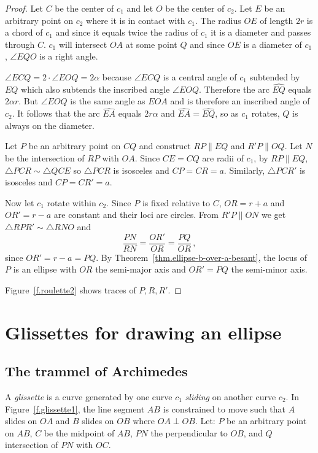 \begin{proof}
Let $C$ be the center of $c_1$ and let $O$ be the center of $c_2$. Let $E$ be an arbitrary point on $c_2$ where it is in contact with $c_1$. The radius $OE$ of length $2r$ is a chord of $c_1$ and since it equals twice the radius of $c_1$ it is a diameter and passes through $C$. $c_1$ will intersect $OA$ at some point $Q$ and since $OE$ is a diameter of $c_1$, $\angle EQO$ is a right angle.

$\angle ECQ=2\cdot\angle EOQ=2\alpha$ because $\angle ECQ$ is a central angle of $c_1$ subtended by $EQ$ which also subtends the inscribed angle $\angle EOQ$. Therefore the arc $\widehat{EQ}$ equals $2\alpha r$. But $\angle EOQ$ is the same angle as $EOA$ and is therefore an inscribed angle of $c_2$. It follows that the arc $\widehat{EA}$ equals $2r\alpha$ and $\widehat{EA} =\widehat{EQ}$, so as $c_1$ rotates, $Q$ is always on the diameter.

Let $P$ be an arbitrary point on $CQ$ and construct $RP\parallel EQ$ and $R'P\parallel OQ$. Let $N$ be the intersection of $RP$ with $OA$. Since $CE=CQ$ are radii of $c_1$, by $RP\parallel EQ$, $\triangle PCR\sim \triangle QCE$ so $\triangle PCR$ is isosceles and $CP=CR=a$. Similarly, $\triangle PCR'$ is isosceles and $CP=CR'=a$.

Now let $c_1$ rotate within $c_2$. Since $P$ is fixed relative to $C$, $OR=r+a$ and $OR'=r-a$ are constant and their loci are circles. From $R'P\parallel ON$ we get $\triangle RPR'\sim \triangle RNO$ and
\[
\frac{PN}{RN} = \frac{OR'}{OR}=\frac{PQ}{OR}\,,
\]
since $OR'=r-a=PQ$. By Theorem~\ref{thm.ellipse-b-over-a-besant}, the locus of $P$ is an ellipse with $OR$ the semi-major axis and $OR'=PQ$ the semi-minor axis.

Figure~\ref{f.roulette2} shows traces of $P,R,R'$.\hqed
\end{proof}


\section{Glissettes for drawing an ellipse}\label{s.glissette}

\subsection*{The trammel of Archimedes}

 A \emph{glissette} is a curve generated by one curve $c_1$ \emph{sliding} on another curve $c_2$. In Figure~\ref{f.glissette1}, the line segment $AB$ is constrained to move such that $A$ slides on $OA$ and $B$ slides on $OB$ where $OA\perp OB$. Let: $P$ be an arbitrary point on $AB$, $C$ be the midpoint of $AB$, $PN$ the perpendicular to $OB$, and $Q$ intersection of $PN$ with $OC$. 

